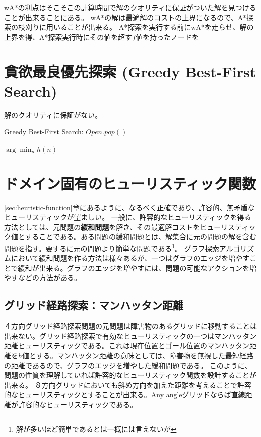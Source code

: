 \documentclass[b5paper]{report}
\begin{document}
wA*の利点はそこそこの計算時間で解のクオリティに保証がついた解を見つけることが出来ることにある。
wA*の解は最適解のコストの上界になるので、A*探索の枝刈りに用いることが出来る。
A*探索を実行する前にwA*を走らせ、解の上界を得、A*探索実行時にその値を超す$f$値を持ったノードを


\section{貪欲最良優先探索 (Greedy Best-First Search)}
\label{sec:greedy-best-first-search}

解のクオリティに保証がない。

\begin{algorithm}
\caption{Greedy Best-First Search: $Open.pop()$}
\label{alg:gfs-open}
	\Return $\arg \min_n h(n)$
\end{algorithm}


\section{ドメイン固有のヒューリスティック関数}
\label{sec:heuristic-example}

\ref{sec:heuristic-function}章にあるように、なるべく正確であり、許容的、無矛盾なヒューリスティックが望ましい。
一般に、許容的なヒューリスティックを得る方法としては、元問題の{\bf 緩和問題}を解き、その最適解コストをヒューリスティック値とすることである。ある問題の緩和問題とは、解集合に元の問題の解を含む問題を指す。要するに元の問題より簡単な問題である\footnote{解が多いほど簡単であるとは一概には言えないが}。
グラフ探索アルゴリズムにおいて緩和問題を作る方法は様々あるが、一つはグラフのエッジを増やすことで緩和が出来る。グラフのエッジを増やすには、問題の可能なアクションを増やすなどの方法がある。

\subsection{グリッド経路探索：マンハッタン距離}

４方向グリッド経路探索問題の元問題は障害物のあるグリッドに移動することは出来ない。グリッド経路探索で有効なヒューリスティックの一つはマンハッタン距離ヒューリスティックである。これは現在位置とゴール位置のマンハッタン距離を$h$値とする。マンハッタン距離の意味としては、障害物を無視した最短経路の距離であるので、グラフのエッジを増やした緩和問題である。
このように、問題の性質を理解していれば許容的なヒューリスティック関数を設計することが出来る。
８方向グリッドにおいても斜め方向を加えた距離を考えることで許容的なヒューリスティックとすることが出来る。Any angleグリッドならば直線距離が許容的なヒューリスティックである。
\end{document}
